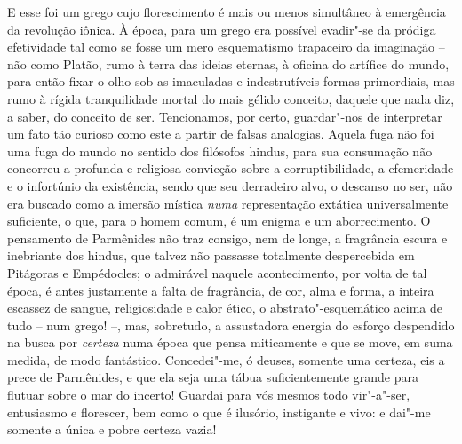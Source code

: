 E esse foi um grego cujo florescimento é mais ou menos simultâneo à
emergência da revolução iônica. À época, para um grego era possível
evadir"-se da pródiga efetividade tal como se fosse um mero esquematismo
trapaceiro da imaginação -- não como Platão, rumo à terra das ideias
eternas, à oficina do artífice do mundo, para então fixar o olho sob as
imaculadas e indestrutíveis formas primordiais, mas rumo à rígida
tranquilidade mortal do mais gélido conceito, daquele que nada diz, a
saber, do conceito de ser. Tencionamos, por certo, guardar"-nos de
interpretar um fato tão curioso como este a partir de falsas analogias.
Aquela fuga não foi uma fuga do mundo no sentido dos filósofos hindus,
para sua consumação não concorreu a profunda e religiosa convicção
sobre a corruptibilidade, a efemeridade e o infortúnio da existência,
sendo que seu derradeiro alvo, o descanso no ser, não era buscado como
a imersão mística \textit{numa} representação extática universalmente
suficiente, o que, para o homem comum, é um enigma e um aborrecimento.
O pensamento de Parmênides não traz consigo, nem de longe, a fragrância
escura e inebriante dos hindus, que talvez não passasse totalmente
despercebida em Pitágoras e Empédocles; o admirável naquele
acontecimento, por volta de tal época, é antes justamente a falta de
fragrância, de cor, alma e forma, a inteira escassez de sangue,
religiosidade e calor ético, o abstrato"-esquemático acima de tudo -- num
grego! --, mas, sobretudo, a assustadora energia do esforço despendido
na busca por \textit{certeza} numa época que pensa miticamente e que se
move, em suma medida, de modo fantástico. Concedei"-me, ó deuses,
somente uma certeza, eis a prece de Parmênides, e que ela seja uma
tábua suficientemente grande para flutuar sobre o mar do incerto!
Guardai para vós mesmos todo vir"-a"-ser, entusiasmo e florescer, bem
como o que é ilusório, instigante e vivo: e dai"-me somente a única e
pobre certeza vazia!

